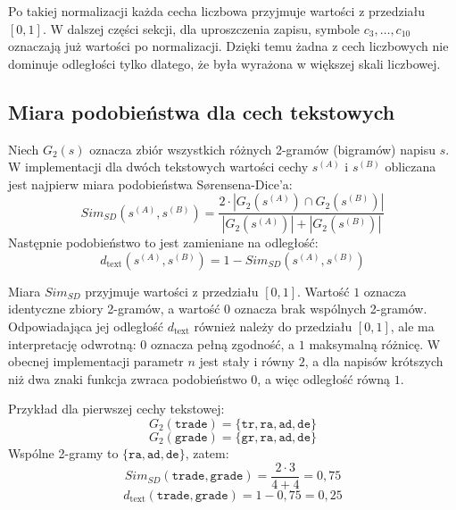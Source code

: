 \documentclass{article}
\begin{document}
Po takiej normalizacji każda cecha liczbowa przyjmuje wartości z przedziału $[0,1]$.
W dalszej części sekcji, dla uproszczenia zapisu, symbole $c_3,\ldots,c_{10}$ oznaczają już
wartości po normalizacji. Dzięki temu żadna z cech liczbowych nie dominuje odległości tylko
dlatego, że była wyrażona w większej skali liczbowej.

\subsection{Miara podobieństwa dla cech tekstowych}
Niech $G_2(s)$ oznacza zbiór wszystkich różnych 2-gramów (bigramów) napisu $s$. W
implementacji dla dwóch tekstowych wartości cechy $s^{(A)}$ i $s^{(B)}$ obliczana jest
najpierw miara podobieństwa Sørensena-Dice'a:
\begin{equation}
    Sim_{SD}(s^{(A)}, s^{(B)}) =
    \frac{2 \cdot |G_2(s^{(A)}) \cap G_2(s^{(B)})|}{|G_2(s^{(A)})| + |G_2(s^{(B)})|}
\end{equation}
Następnie podobieństwo to jest zamieniane na odległość:
\begin{equation}
    d_{\text{text}}(s^{(A)}, s^{(B)}) = 1 - Sim_{SD}(s^{(A)}, s^{(B)})
\end{equation}

Miara $Sim_{SD}$ przyjmuje wartości z przedziału $[0,1]$. Wartość $1$ oznacza identyczne
zbiory 2-gramów, a wartość $0$ oznacza brak wspólnych 2-gramów. Odpowiadająca jej odległość
$d_{\text{text}}$ również należy do przedziału $[0,1]$, ale ma interpretację odwrotną:
$0$ oznacza pełną zgodność, a $1$ maksymalną różnicę. W obecnej implementacji parametr
$n$ jest stały i równy $2$, a dla napisów krótszych niż dwa znaki funkcja zwraca podobieństwo
$0$, a więc odległość równą $1$.

Przykład dla pierwszej cechy tekstowej:
\begin{equation}
    G_2(\texttt{trade}) = \{\texttt{tr}, \texttt{ra}, \texttt{ad}, \texttt{de}\}
\end{equation}
\begin{equation}
    G_2(\texttt{grade}) = \{\texttt{gr}, \texttt{ra}, \texttt{ad}, \texttt{de}\}
\end{equation}
Wspólne 2-gramy to $\{\texttt{ra}, \texttt{ad}, \texttt{de}\}$, zatem:
\begin{equation}
    Sim_{SD}(\texttt{trade}, \texttt{grade}) = \frac{2 \cdot 3}{4 + 4} = 0{,}75
\end{equation}
\begin{equation}
    d_{\text{text}}(\texttt{trade}, \texttt{grade}) = 1 - 0{,}75 = 0{,}25
\end{equation}
\end{document}
